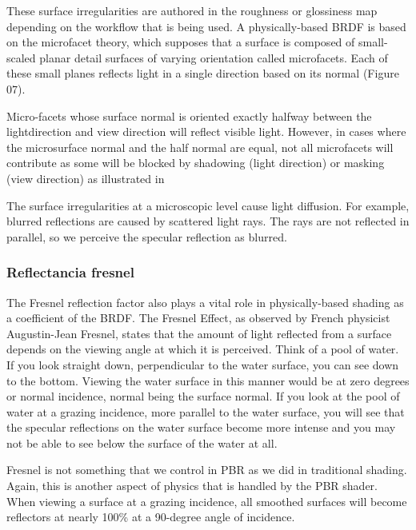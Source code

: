             These surface irregularities are authored in the roughness or glossiness map depending
            on the workflow that is being used. A physically-based BRDF is based on the microfacet
            theory, which supposes that a surface is composed of small-scaled planar detail surfaces
            of varying orientation called microfacets. Each of these small planes reflects light in
            a single direction based on its normal (Figure 07).
            
            Micro-facets whose surface normal is oriented exactly halfway between the lightdirection
            and view direction will reflect visible light. However, in cases where the microsurface
            normal and the half normal are equal, not all microfacets will contribute as some will
            be blocked by shadowing (light direction) or masking (view direction) as illustrated in
            
            The surface irregularities at a microscopic level cause light diffusion. For example,
            blurred reflections are caused by scattered light rays. The rays are not reflected in
            parallel, so we perceive the specular reflection as blurred.

        \subsubsection{Reflectancia fresnel}
            The Fresnel reflection factor also plays a vital role in physically-based shading as a
            coefficient of the BRDF. The Fresnel Effect, as observed by French physicist Augustin-Jean
            Fresnel, states that the amount of light reflected from a surface depends on the viewing
            angle at which it is perceived. Think of a pool of water. If you look straight down,
            perpendicular to the water surface, you can see down to the bottom. Viewing the water surface
            in this manner would be at zero degrees or normal incidence, normal being the surface normal.
            If you look at the pool of water at a grazing incidence, more parallel to the water surface,
            you will see that the specular reflections on the water surface become more intense and you
            may not be able to see below the surface of the water at all.

            Fresnel is not something that we control in PBR as we did in traditional shading. Again, this is
            another aspect of physics that is handled by the PBR shader. When viewing a surface at a grazing
            incidence, all smoothed surfaces will become reflectors at nearly 100\% at a 90-degree angle of
            incidence.
            
